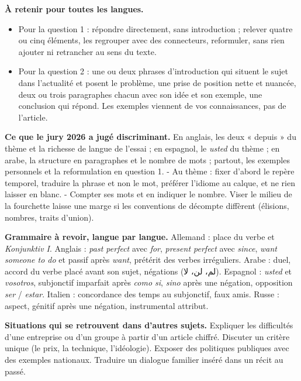 \documentclass[11pt,a4paper]{article}
\providecommand{\tightlist}{\setlength{\itemsep}{0pt}\setlength{\parskip}{0pt}}
\begin{document}
\textbf{À retenir pour toutes les langues.}

\begin{itemize}
\tightlist
\item
  Pour la question 1 : répondre directement, sans introduction ; relever quatre ou cinq éléments, les regrouper avec des connecteurs, reformuler, sans rien ajouter ni retrancher au sens du texte.
\item
  Pour la question 2 : une ou deux phrases d'introduction qui situent le sujet dans l'actualité et posent le problème, une prise de position nette et nuancée, deux ou trois paragraphes chacun avec son idée et son exemple, une conclusion qui répond. Les exemples viennent de vos connaissances, pas de l'article.
\end{itemize}

\textbf{Ce que le jury 2026 a jugé discriminant.} En anglais, les deux « depuis » du thème et la richesse de langue de l'essai ; en espagnol, le \emph{usted} du thème ; en arabe, la structure en paragraphes et le nombre de mots ; partout, les exemples personnels et la reformulation en question 1.
- Au thème : fixer d'abord le repère temporel, traduire la phrase et non le mot, préférer l'idiome au calque, et ne rien laisser en blanc.
- Compter ses mots et en indiquer le nombre. Viser le milieu de la fourchette laisse une marge si les conventions de décompte diffèrent (élisions, nombres, traits d'union).

\textbf{Grammaire à revoir, langue par langue.} Allemand : place du verbe et \emph{Konjunktiv I}. Anglais : \emph{past perfect} avec \emph{for}, \emph{present perfect} avec \emph{since}, \emph{want someone to do} et passif après \emph{want}, prétérit des verbes irréguliers. Arabe : duel, accord du verbe placé avant son sujet, négations (لم، لن، لا). Espagnol : \emph{usted} et \emph{vosotros}, subjonctif imparfait après \emph{como si}, \emph{sino} après une négation, opposition \emph{ser} / \emph{estar}. Italien : concordance des temps au subjonctif, faux amis. Russe : aspect, génitif après une négation, instrumental attribut.

\textbf{Situations qui se retrouvent dans d'autres sujets.} Expliquer les difficultés d'une entreprise ou d'un groupe à partir d'un article chiffré. Discuter un critère unique (le prix, la technique, l'idéologie). Exposer des politiques publiques avec des exemples nationaux. Traduire un dialogue familier inséré dans un récit au passé.
\end{document}
